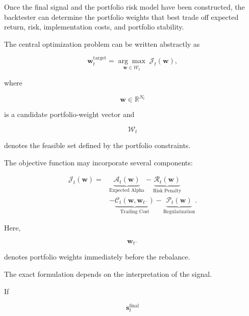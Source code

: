 \documentclass[11pt,a4paper]{article}
\begin{document}
Once the final signal and the portfolio risk model have been constructed, the
backtester can determine the portfolio weights that best trade off expected
return, risk, implementation costs, and portfolio stability.

The central optimization problem can be written abstractly as

\begin{equation}
\boxed{
\mathbf{w}_t^{\mathrm{target}}
=
\underset{\mathbf{w}\in\mathcal{W}_t}{\arg\max}
\;
\mathcal{J}_t
\left(
\mathbf{w}
\right),
}
\end{equation}

where

\begin{equation}
\mathbf{w}
\in
\mathbb{R}^{N_t}
\end{equation}

is a candidate portfolio-weight vector and

\begin{equation}
\mathcal{W}_t
\end{equation}

denotes the feasible set defined by the portfolio constraints.

The objective function may incorporate several components:

\begin{equation}
\boxed{
\begin{aligned}
\mathcal{J}_t(\mathbf{w})
=
&
\underbrace{
\mathcal{A}_t(\mathbf{w})
}_{\text{Expected Alpha}}
-
\underbrace{
\mathcal{R}_t(\mathbf{w})
}_{\text{Risk Penalty}}
\\
&
-
\underbrace{
\mathcal{C}_t(\mathbf{w},\mathbf{w}_{t^-})
}_{\text{Trading Cost}}
-
\underbrace{
\mathcal{P}_t(\mathbf{w})
}_{\text{Regularization}}.
\end{aligned}
}
\end{equation}

Here,

\begin{equation}
\mathbf{w}_{t^-}
\end{equation}

denotes portfolio weights immediately before the rebalance.

The exact formulation depends on the interpretation of the signal.

If

\begin{equation}
\mathbf{s}_t^{\mathrm{final}}
\end{equation}
\end{document}
